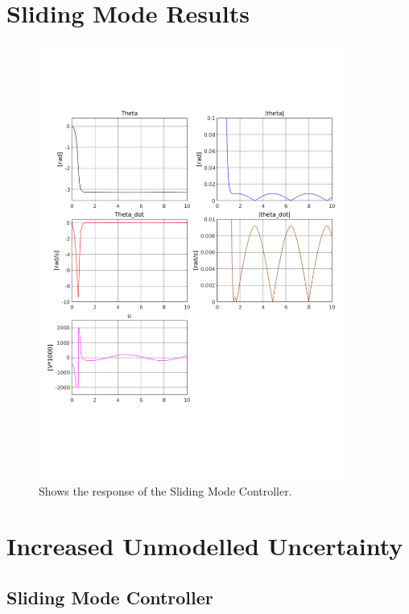 \chapter{Sliding Mode Results} %
\label{cha:sliding_mode}
\begin{figure}[H]
        \centering
        \includegraphics[width=0.9\textwidth,trim=0.5cm 5cm 0.5cm 4cm, clip]{smc.pdf}
        \caption{Shows the response of the Sliding Mode Controller.}
        \label{fig:smc}
\end{figure}

\chapter{Increased Unmodelled Uncertainty} %
\label{cha:extreme_dis}
\section{Sliding Mode Controller} %
\label{sec:sliding_mode_controller}

